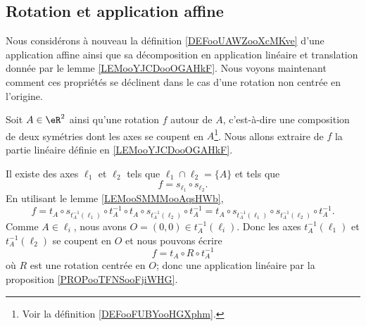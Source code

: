 \subsection{Rotation et application affine}

Nous considérons à nouveau la définition \ref{DEFooUAWZooXcMKve} d'une application affine ainsi que sa décomposition en application linéaire et translation donnée par le lemme \ref{LEMooYJCDooOGAHkF}. Nous voyons maintenant comment ces propriétés se déclinent dans le cas d'une rotation non centrée en l'origine.

\begin{example}
	Soit \( A\in \eR^2\) ainsi qu'une rotation \( f\) autour de \( A\), c'est-à-dire une composition de deux symétries dont les axes se coupent en \( A\)\footnote{Voir la définition \ref{DEFooFUBYooHGXphm}.}. Nous allons extraire de \( f\) la partie linéaire définie en \ref{LEMooYJCDooOGAHkF}.

	Il existe des axes \( \ell_1\) et \( \ell_2\) tels que \( \ell_1\cap\ell_2=\{ A \}\) et tels que
	\begin{equation}
		f=s_{\ell_1}\circ s_{\ell_2}.
	\end{equation}
	En utilisant le lemme \ref{LEMooSMMMooAqsHWb},
	\begin{equation}
		f=t_A\circ s_{t^{-1}_A(\ell_1)}\circ t_A^{-1}\circ t_A\circ s_{t_A^{-1}(\ell_2)}\circ t_A^{-1}=t_A\circ s_{t^{-1}_A(\ell_1)}\circ s_{t_A^{-1}(\ell_2)}\circ t_A^{-1}.
	\end{equation}
	Comme \( A\in\ell_i\), nous avons \( O=(0,0)\in t_A^{-1}(\ell_i)\). Donc les axes \( t_A^{-1}(\ell_1)\) et \( t_A^{-1}(\ell_2)\) se coupent en \( O\) et nous pouvons écrire
	\begin{equation}        %
		f=t_A\circ R\circ t_A^{-1}
	\end{equation}
	où \( R\) est une rotation centrée en \( O\); donc une application linéaire par la proposition \ref{PROPooTFNSooFjiWHG}.


\end{example}
